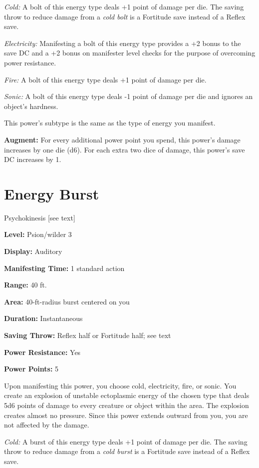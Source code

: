\documentclass{article}
\begin{document}
\textit{Cold: }A bolt of this energy type deals +1 point of damage per die. The 
saving throw to reduce damage from a \textit{cold bolt }is a Fortitude save instead 
of a Reflex save.

\textit{Electricity: }Manifesting a bolt of this energy type provides a +2 bonus 
to the save DC and a +2 bonus on manifester level checks for the purpose of overcoming 
power resistance.

\textit{Fire: }A bolt of this energy type deals +1 point of damage per die.

\textit{Sonic: }A bolt of this energy type deals -1 point of damage per die and 
ignores an object's hardness.

This power's subtype is the same as the type of energy you manifest. 

\textbf{Augment:} For every additional power point you spend, this power's damage 
increases by one die (d6). For each extra two dice of damage, this power's save 
DC increases by 1.

\vspace{12pt}
\section*{Energy Burst}

Psychokinesis [see text]

\textbf{Level:} Psion/wilder 3

\textbf{Display:} Auditory

\textbf{Manifesting Time:} 1 standard action

\textbf{Range:} 40 ft.

\textbf{Area:} 40-ft-radius burst centered on you

\textbf{Duration:} Instantaneous

\textbf{Saving Throw:} Reflex half or Fortitude half; see text

\textbf{Power Resistance:} Yes

\textbf{Power Points:} 5

Upon manifesting this power, you choose cold, electricity, fire, or sonic. You 
create an explosion of unstable ectoplasmic energy of the chosen type that deals 
5d6 points of damage to every creature or object within the area. The explosion 
creates almost no pressure. Since this power extends outward from you, you are 
not affected by the damage.

\textit{Cold: }A burst of this energy type deals +1 point of damage per die. The 
saving throw to reduce damage from a \textit{cold burst }is a Fortitude save instead 
of a Reflex save.
\end{document}
